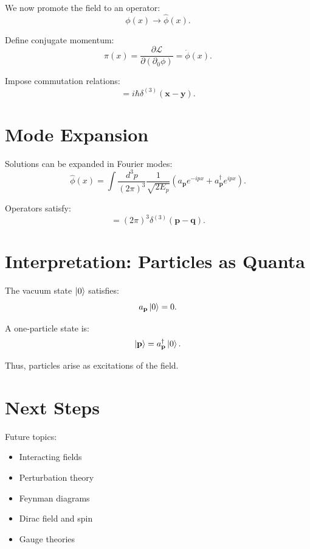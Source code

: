 \documentclass[11pt]{article}
\begin{document}
We now promote the field to an operator:
\begin{equation}
\phi(x) \rightarrow \hat{\phi}(x).
\end{equation}

Define conjugate momentum:
\begin{equation}
\pi(x) = \frac{\partial \mathcal{L}}{\partial (\partial_0 \phi)} = \dot{\phi}(x).
\end{equation}

Impose commutation relations:
\begin{equation}
[\hat{\phi}(\mathbf{x},t), \hat{\pi}(\mathbf{y},t)] = i \hbar \delta^{(3)}(\mathbf{x}-\mathbf{y}).
\end{equation}

\section{Mode Expansion}

Solutions can be expanded in Fourier modes:
\begin{equation}
\hat{\phi}(x) = \int \frac{d^3 p}{(2\pi)^3} \frac{1}{\sqrt{2E_p}} \left(a_{\mathbf{p}} e^{-ipx} + a^\dagger_{\mathbf{p}} e^{ipx}\right).
\end{equation}

Operators satisfy:
\begin{equation}
[a_{\mathbf{p}}, a^\dagger_{\mathbf{q}}] = (2\pi)^3 \delta^{(3)}(\mathbf{p}-\mathbf{q}).
\end{equation}

\section{Interpretation: Particles as Quanta}

The vacuum state $\ket{0}$ satisfies:
\begin{equation}
a_{\mathbf{p}} \ket{0} = 0.
\end{equation}

A one-particle state is:
\begin{equation}
\ket{\mathbf{p}} = a^\dagger_{\mathbf{p}} \ket{0}.
\end{equation}

Thus, particles arise as excitations of the field.

\section{Next Steps}

Future topics:
\begin{itemize}
\item Interacting fields
\item Perturbation theory
\item Feynman diagrams
\item Dirac field and spin
\item Gauge theories
\end{itemize}
\end{document}
